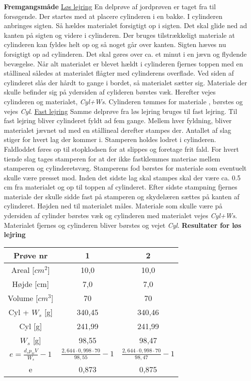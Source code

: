 \textbf{Fremgangsmåde}
\newline
\underline{Løs lejring}
\newline
En delprøve af jordprøven er taget fra til forsøgende. Der startes med at placere cylinderen i en bakke. I cylinderen anbringes sigten. Så hældes materialet forsigtigt  op i sigten. Det skal glide ned ad kanten på sigten og videre i cylinderen. Der bruges tilstrækkeligt materiale at cylinderen kan fyldes helt op og så noget går over kanten. Sigten hæves nu forsigtigt op ad cylinderen. Det skal gøres over ca. et minut  i en jævn og flydende bevægelse. Når alt materialet er blevet hældt i cylinderen fjernes toppen med en stållineal således at materialet flågter med cylinderens overflade. Ved siden af cylinderet slås der hårdt to gange i bordet, så materialet sætter sig. Materiale der skulle befinder sig på ydersiden af cylideren børstes væk. Herefter vejes cylinderen og materialet, \textit{Cyl+Ws}. Cylinderen tømmes for materiale , børstes og vejes \textit{Cyl}.
\newline
\newline
\underline{Fast lejring}
\newline
Samme delprøve fra løs lejring bruges til fast lejring. Til fast lejring bliver cylinderet fyldt ad fem gange. Mellem hver fyldning, bliver materialet jævnet ud med en stållineal derefter stampes der. Antallet af slag stiger for hvert lag der kommer i. Stamperen holdes lodret i cylinderen. Faldloddet føres op til stopklodsen for at slippes og foretage frit fald. For hvert tiende slag tages stamperen for at der ikke fastklemmes materiae mellem stamperen og cylinderetsvæg. Stamperens fod børstes for materiale som eventuelt skulle være presset mod. Inden det sidste lag skal stampes skal der være ca. 0.5 cm fra materialet og op til toppen af cylinderet. Efter sidste stampning fjernes materiale der skulle sidde fast på stamperen og skydelæren sættes på kanten af cylinderet. Højden ned til materialet måles. Materiale som skulle være på ydersiden af cylinder børstes væk og cylinderen med materialet vejes \textit{Cyl+Ws}. Materialet fjernes og cylinderen bliver børstes og vejet \textit{Cyl}.
\newline
\newline
\textbf{Resultater for løs lejring}
\begin{center}
	\begin{tabular}{ |c|c|c| } 
		\hline
		Prøve nr & 1 & 2 \\	\hline 
		Areal [$cm^2$] & 10,0 & 10,0 \\ \hline
		Højde [cm] & 7,0 & 7,0 \\ \hline
		Volume [$cm^3$] & 70 & 70 \\ \hline
		Cyl + $W_s$ [g] & 340,45 & 340,46 \\ \hline
		Cyl [g] & 241,99 & 241,99 \\ \hline
		$W_s$ [g] & 98,55 & 98,47 \\ \hline
		$e=\frac{d_sp_wV}{W_s}-1$ & $\frac{2,644\cdot0,998\cdot70}{98,55}-1$ & $\frac{2,644\cdot0,998\cdot70}{98,47}-1$  \\ \hline
		e & 0,873 & 0,875 \\ \hline
	\end{tabular}
\end{center}

